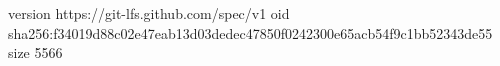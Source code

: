 version https://git-lfs.github.com/spec/v1
oid sha256:f34019d88c02e47eab13d03dedec47850f0242300e65acb54f9c1bb52343de55
size 5566
